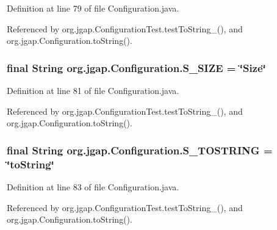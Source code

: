 Definition at line 79 of file Configuration.\-java.



Referenced by org.\-jgap.\-Configuration\-Test.\-test\-To\-String\-\_(), and org.\-jgap.\-Configuration.\-to\-String().

\hypertarget{classorg_1_1jgap_1_1_configuration_aee9a01fe1f940cba39fdf7e884215541}{
\subsubsection[{S\-\_\-\-S\-I\-Z\-E}]{\setlength{\rightskip}{0pt plus 5cm}final String org.\-jgap.\-Configuration.\-S\-\_\-\-S\-I\-Z\-E = \char`\"{}Size\char`\"{}\hspace{0.3cm}{\ttfamily [static]}}}\label{classorg_1_1jgap_1_1_configuration_aee9a01fe1f940cba39fdf7e884215541}


Definition at line 81 of file Configuration.\-java.



Referenced by org.\-jgap.\-Configuration\-Test.\-test\-To\-String\-\_(), and org.\-jgap.\-Configuration.\-to\-String().

\hypertarget{classorg_1_1jgap_1_1_configuration_ad1d7b5af8796e7bbe8995287ce3beb8d}{
\subsubsection[{S\-\_\-\-T\-O\-S\-T\-R\-I\-N\-G}]{\setlength{\rightskip}{0pt plus 5cm}final String org.\-jgap.\-Configuration.\-S\-\_\-\-T\-O\-S\-T\-R\-I\-N\-G = \char`\"{}to\-String\char`\"{}\hspace{0.3cm}{\ttfamily [static]}}}\label{classorg_1_1jgap_1_1_configuration_ad1d7b5af8796e7bbe8995287ce3beb8d}


Definition at line 83 of file Configuration.\-java.



Referenced by org.\-jgap.\-Configuration\-Test.\-test\-To\-String\-\_(), and org.\-jgap.\-Configuration.\-to\-String().

